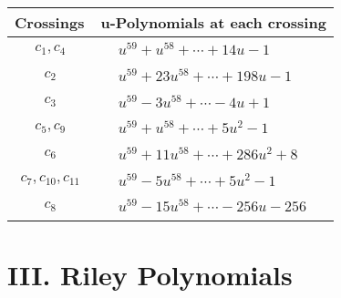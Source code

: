 \documentclass[1p]{elsarticle_modified}
\theoremstyle{definition}
\begin{document}
\begin{tabular}{m{50pt}|m{274pt}}
Crossings & \hspace{64pt}u-Polynomials at each crossing \\
\hline $$\begin{aligned}c_{1},c_{4}\end{aligned}$$&$\begin{aligned}
&u^{59}+u^{58}+\cdots+14 u-1
\end{aligned}$\\
\hline $$\begin{aligned}c_{2}\end{aligned}$$&$\begin{aligned}
&u^{59}+23 u^{58}+\cdots+198 u-1
\end{aligned}$\\
\hline $$\begin{aligned}c_{3}\end{aligned}$$&$\begin{aligned}
&u^{59}-3 u^{58}+\cdots-4 u+1
\end{aligned}$\\
\hline $$\begin{aligned}c_{5},c_{9}\end{aligned}$$&$\begin{aligned}
&u^{59}+u^{58}+\cdots+5 u^2-1
\end{aligned}$\\
\hline $$\begin{aligned}c_{6}\end{aligned}$$&$\begin{aligned}
&u^{59}+11 u^{58}+\cdots+286 u^2+8
\end{aligned}$\\
\hline $$\begin{aligned}c_{7},c_{10},c_{11}\end{aligned}$$&$\begin{aligned}
&u^{59}-5 u^{58}+\cdots+5 u^2-1
\end{aligned}$\\
\hline $$\begin{aligned}c_{8}\end{aligned}$$&$\begin{aligned}
&u^{59}-15 u^{58}+\cdots-256 u-256
\end{aligned}$\\
\hline
\end{tabular}\newpage\renewcommand{\arraystretch}{1}
\centering \section*{ III. Riley Polynomials}
\end{document}
